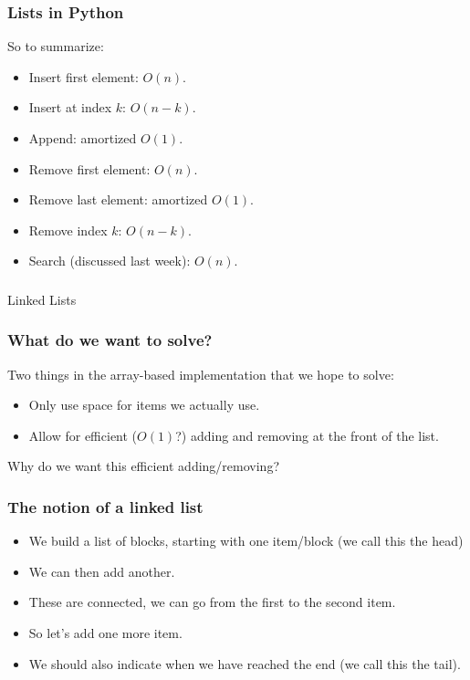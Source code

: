 \begin{frame}
	\frametitle{Lists in Python}
	So to summarize:
	\begin{itemize}
		\item Insert first element: $O(n)$.
		\item Insert at index $k$: $O(n-k)$.
		\item Append: amortized $O(1)$.
		\item Remove first element: $O(n)$.
		\item Remove last element: amortized $O(1)$.
		\item Remove index $k$: $O(n-k)$.
		\item Search (discussed last week): $O(n)$.
	\end{itemize}
\end{frame}

\begin{frame}[fragile]\frametitle{}
\begin{center}
{\Large Linked Lists}
\end{center}

\end{frame}

\begin{frame}
	\frametitle{What do we want to solve?}
	
		Two things in the array-based implementation that we hope to solve:
		\begin{itemize}
			\item Only use space for items we actually use.
			\item Allow for efficient ($O(1)$?) adding and removing at the front of the list.
		\end{itemize}
	
		Why do we want this efficient adding/removing?
\end{frame}

\begin{frame}
	\frametitle{The notion of a linked list}
			\begin{itemize}
				\item We build a list of blocks, starting with one item/block (we call this the \alert{head})
				\item We can then add another.
				\item These are connected, we can go from the first to the second item.
				\item So let's add one more item.
				\item We should also indicate when we have reached the end (we call this the \alert{tail}).
			\end{itemize}
\end{frame}


